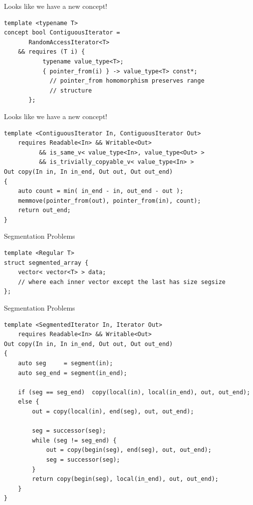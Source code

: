 \documentclass[aspectratio=169]{beamer}
\begin{document}
\begin{frame}[fragile]{Looks like we have a new concept!}
\begin{lstlisting}
template <typename T>
concept bool ContiguousIterator =
       RandomAccessIterator<T>
    && requires (T i) {
           typename value_type<T>;
           { pointer_from(i) } -> value_type<T> const*;
             // pointer_from homomorphism preserves range
             // structure
       };
\end{lstlisting}
\end{frame}


\begin{frame}[fragile]{Looks like we have a new concept!}
\begin{lstlisting}
template <ContiguousIterator In, ContiguousIterator Out>
    requires Readable<In> && Writable<Out>
          && is_same_v< value_type<In>, value_type<Out> >
          && is_trivially_copyable_v< value_type<In> >
Out copy(In in, In in_end, Out out, Out out_end)
{
    auto count = min( in_end - in, out_end - out );
    memmove(pointer_from(out), pointer_from(in), count);
    return out_end;
}
\end{lstlisting}
\end{frame}


\begin{frame}{Segmentation Problems}
  \pause{}
\begin{lstlisting}
template <Regular T>
struct segmented_array {
    vector< vector<T> > data;
    // where each inner vector except the last has size segsize
};
\end{lstlisting}
\end{frame}


\begin{frame}[fragile]{Segmentation Problems}
  \scriptsize
\begin{lstlisting}
template <SegmentedIterator In, Iterator Out>
    requires Readable<In> && Writable<Out>
Out copy(In in, In in_end, Out out, Out out_end)
{
    auto seg     = segment(in);
    auto seg_end = segment(in_end);

    if (seg == seg_end)  copy(local(in), local(in_end), out, out_end);
    else {
        out = copy(local(in), end(seg), out, out_end);

        seg = successor(seg);
        while (seg != seg_end) {
            out = copy(begin(seg), end(seg), out, out_end);
            seg = successor(seg);
        }
        return copy(begin(seg), local(in_end), out, out_end);
    }
}
\end{lstlisting}
\end{frame}
\end{document}

